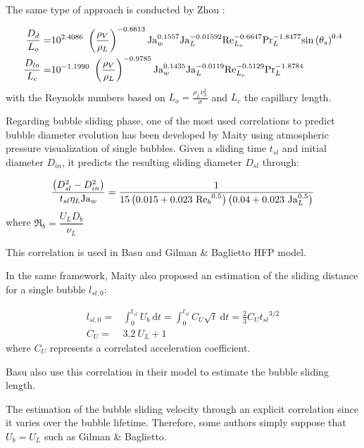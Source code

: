 \npar

The same type of approach is conducted by Zhou \etal:

\begin{align}
\frac{D_{d}}{L_{o}} =& 10^{2.4086}\ \parth{\frac{\rho_{V}}{\rho_{L}}}^{-0.6613} \Ja_{w}^{0.1557} \Ja_{L}^{-0.01592} \Re_{L_{o}}^{-0.6647} \Pr_{L}^{-1.8477} \sin{\theta_{s}}^{0.4}\\
%
\frac{D_{lo}}{L_{c}} =& 10^{-1.1990}\ \parth{\frac{\rho_{V}}{\rho_{L}}}^{-0.9785} \Ja_{w}^{0.1435} \Ja_{L}^{-0.0119} \Re_{L_{c}}^{-0.5129} \Pr_{L}^{-1.8784}
\end{align}
with the Reynolds numbers based on $L_{o} = \frac{\rho_{L}\nu_{L}^{2}}{\sigma}$ and $L_{c}$ the capillary length.

\npar


Regarding bubble sliding phase, one of the most used correlations to predict bubble diameter evolution has been developed by Maity \cite{maity_effect_2000} using atmospheric pressure visualization of single bubbles. Given a sliding time $t_{sl}$ and initial diameter $D_{in}$, it predicts the resulting sliding diameter $D_{sl}$ through:

\begin{equation}
\frac{\left( D_{sl}^{2} - D_{in}^{2} \right) }{t_{sl} \eta_{L} \mathrm{Ja}_{w}} = \frac{1}{15\left( 0.015+0.023\ {\mathrm{Re}_{b}}^{0.5}  \right) \left( 0.04+0.023\ \mathrm{Ja}_{L}^{0.5} \right) }
\end{equation}
where $\Re_{b}=\dfrac{U_{L}D_{b}}{\nu_{L}}$

\begin{remark*}{}
This correlation is used in Basu \etal and Gilman \& Baglietto HFP model.
\end{remark*}


In the same framework, Maity also proposed an estimation of the sliding distance for a single bubble $l_{sl,0}$:

\begin{align}
l_{sl,0}=& \int_{0}^{t_{sl}} U_{b}\ \mathrm{d}t = \int_{0}^{t_{sl}}C_{U} \sqrt{t}\ \mathrm{d}t =  \frac{2}{3}C_{U}{t_{sl}}^{3/2} \\ 
%
C_{U} =& 3.2\ U_{L}+1
\end{align}
where $C_{U}$ represents a correlated acceleration coefficient.

\begin{remark*}{}
Basu \etal also use this correlation in their model to estimate the bubble sliding length.

The estimation of the bubble sliding velocity through an explicit correlation since it varies over the bubble lifetime. Therefore, some authors simply suppose that $U_{b} = U_{L}$ such as Gilman \& Baglietto.
\end{remark*}


